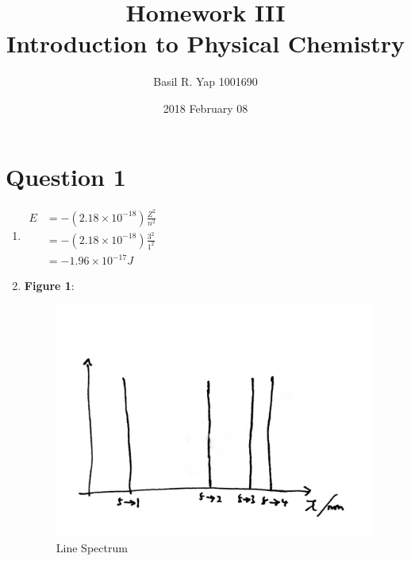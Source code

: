 \documentclass[a4paper, fleqn]{article}
\begin{document}
\title{Homework III \\ Introduction to Physical Chemistry}
\author{Basil R. Yap 1001690}
\date{2018 February 08}
\maketitle

\section{Question 1}

\begin{enumerate}[label=(\alph{*})]
\item $\begin{aligned}E&=-(2.18\times10^{-18})\frac{Z^2}{n^2}\\&=-(2.18\times10^{-18})\frac{3^2}{1^2}\\&=-1.96\times10^{-17}J\end{aligned}$
\item \textbf{Figure 1}:\begin{figure}[h!]
\includegraphics[width=\linewidth]{./assets/201802120749.jpg}
\caption{Line Spectrum}
\label{figure:graph1}
\end{figure}
\end{enumerate}
\pagebreak
\end{document}
